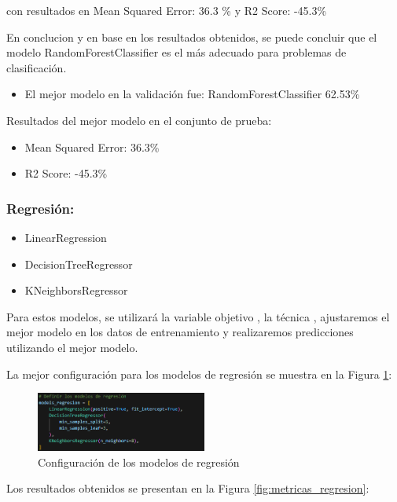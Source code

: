 con resultados en Mean Squared Error: 36.3 \%  y R2 Score: -45.3\%

En conclucion y en base en los resultados obtenidos, se puede concluir que el modelo RandomForestClassifier es el más adecuado para problemas de clasificación.

\begin{itemize}
    \item El mejor modelo en la validación fue: RandomForestClassifier 62.53\%
\end{itemize}

Resultados del mejor modelo en el conjunto de prueba:

\begin{itemize}
    \item Mean Squared Error: 36.3\%
    \item R2 Score: -45.3\%
\end{itemize}

\subsubsection*{Regresión:}

\begin{itemize}
    \item LinearRegression
    \item DecisionTreeRegressor
    \item KNeighborsRegressor
\end{itemize}

Para estos modelos, se utilizará la variable objetivo , la técnica , ajustaremos el mejor modelo en los datos de entrenamiento y realizaremos predicciones utilizando el mejor modelo.

La mejor configuración para los modelos de regresión se muestra en la Figura \ref{fig:config_regresion}:

\begin{figure}[H]
    \centering
    \includegraphics[width=0.5\textwidth]{img/compara_algoritmos/configModelsRegresion.png}
    \caption{Configuración de los modelos de regresión}
    \label{fig:config_regresion}
\end{figure}

Los resultados obtenidos se presentan en la Figura \ref{fig:metricas_regresion}:

